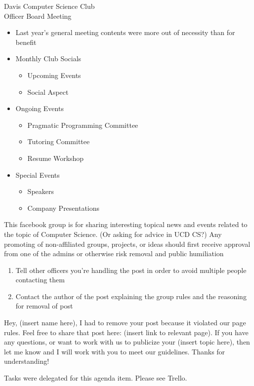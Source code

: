 \documentclass{article}
\begin{document}
\begin{Minutes}{Davis Computer Science Club\\Officer Board Meeting}

\begin{itemize}
	\item Last year's general meeting contents were more out of necessity than for benefit
\end{itemize}


\begin{itemize}
	\item Monthly Club Socials
	\begin{itemize}
		\item Upcoming Events
		\item Social Aspect
	\end{itemize}
	\item Ongoing Events
	\begin{itemize}
		\item Pragmatic Programming Committee
		\item Tutoring Committee
		\item Resume Workshop
	\end{itemize}
	\item Special Events
	\begin{itemize}
		\item Speakers
		\item Company Presentations
	\end{itemize}
\end{itemize}


This facebook group is for sharing interesting topical news and events related to the topic of Computer Science. (Or asking for advice in UCD CS?) Any promoting of non-affiliated groups, projects, or ideas should first receive approval from one of the admins or otherwise risk removal and public humiliation


\begin{enumerate}
	\item Tell other officers you're handling the post in order to avoid multiple people contacting them
	\item Contact the author of the post explaining the group rules and the reasoning for removal of post
\end{enumerate}


Hey, (insert name here), I had to remove your post because it violated our page rules. Feel free to share that post here: (insert link to relevant page). If you have any questions, or want to work with us to publicize your (insert topic here), then let me know and I will work with you to meet our guidelines. Thanks for understanding!


Tasks were delegated for this agenda item. Please see Trello.

\end{Minutes}
\end{document}
